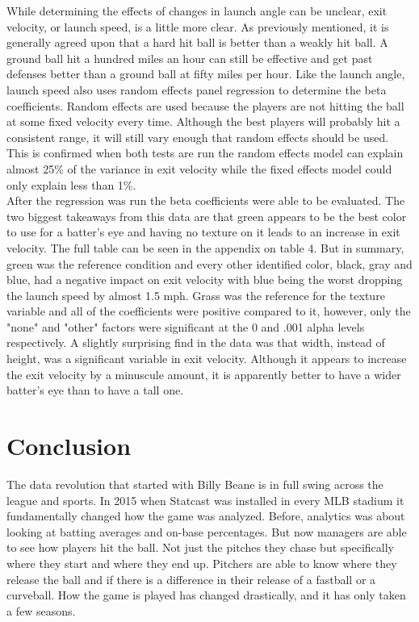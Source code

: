 \documentclass{article}
\begin{document}
\begin{doublespace}
While determining the effects of changes in launch angle can be unclear, exit velocity, or launch speed, is a little more clear. As previously mentioned, it is generally agreed upon that a hard hit ball is better than a weakly hit ball. A ground ball hit a hundred miles an hour can still be effective and get past defenses better than a ground ball at fifty miles per hour. Like the launch angle, launch speed also uses random effects panel regression to determine the beta coefficients. Random effects are used because the players are not hitting the ball at some fixed velocity every time. Although the best players will probably hit a consistent range, it will still vary enough that random effects should be used. This is confirmed when both tests are run the random effects model can explain almost 25\% of the variance in exit velocity while the fixed effects model could only explain less than 1\%. \\

After the regression was run the beta coefficients were able to be evaluated. The two biggest takeaways from this data are that green appears to be the best color to use for a batter's eye and having no texture on it leads to an increase in exit velocity. The full table can be seen in the appendix on table 4. But in summary, green was the reference condition and every other identified color, black, gray and blue, had a negative impact on exit velocity with blue being the worst dropping the launch speed by almost 1.5 mph. Grass was the reference for the texture variable and all of the coefficients were positive compared to it, however, only the "none" and "other" factors were significant at the 0 and .001 alpha levels respectively. A slightly surprising find in the data was that width, instead of height, was a significant variable in exit velocity. Although it appears to increase the exit velocity by a minuscule amount, it is apparently better to have a wider batter's eye than to have a tall one.  \\

\section{Conclusion}
The data revolution that started with Billy Beane is in full swing across the league and sports. In 2015 when Statcast was installed in every MLB stadium it fundamentally changed how the game was analyzed. Before, analytics was about looking at batting averages and on-base percentages. But now managers are able to see how players hit the ball. Not just the pitches they chase but specifically where they start and where they end up. Pitchers are able to know where they release the ball and if there is a difference in their release of a fastball or a curveball. How the game is played has changed drastically, and it has only taken a few seasons. \\


\end{doublespace}
\end{document}
